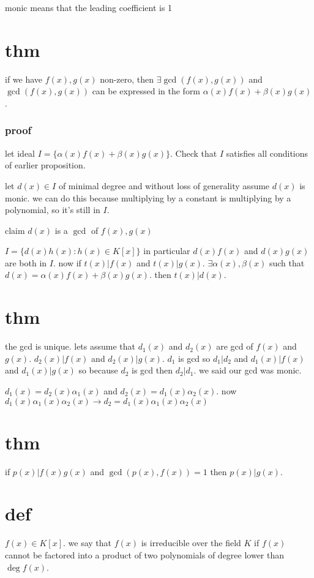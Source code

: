 \documentclass[letterpaper]{article}
\begin{document}
monic means that the leading coefficient is 1


\section*{thm}
if we have $f(x),g(x)$ non-zero, then $\exists\gcd(f(x),g(x))$ and $\gcd(f(x),g(x))$ can be expressed in the form $\alpha(x)f(x)+\beta(x)g(x)$.
\subsubsection*{proof}

let ideal $I=\{\alpha(x)f(x)+\beta(x)g(x)\}$. Check that $I$ satisfies all conditions of earlier proposition.

let $d(x)\in I$ of minimal degree and without loss of generality assume $d(x)$ is monic. we can do this because multiplying by a constant is multiplying by a polynomial, so it's still in $I$.

claim $d(x)$ is a $\gcd$ of $f(x),g(x)$

$I=\{d(x)h(x):h(x)\in K[x]\}$ in particular $d(x)f(x)$ and $d(x)g(x)$ are both in $I$. now if $t(x)|f(x)$ and $t(x)|g(x)$. $\exists\alpha(x),\beta(x)$ such that $d(x)=\alpha(x)f(x)+\beta(x)g(x)$. then $t(x)|d(x)$. 

\section*{thm}
the gcd is unique. lets assume that $d_1(x)$ and $d_2(x)$ are gcd of $f(x)$ and $g(x)$. $d_2(x)|f(x)$ and $d_2(x)|g(x)$. $d_1$ is gcd so $d_1|d_2$ and $d_1(x)|f(x)$ and $d_1(x)|g(x)$ so because $d_2$ is gcd then $d_2|d_1$. we said our gcd was monic.

$d_1(x)=d_2(x)\alpha_1(x)$ and $d_2(x)=d_1(x)\alpha_2(x)$. now $d_1(x)\alpha_1(x)\alpha_2(x)\to d_2=d_1(x)\alpha_1(x)\alpha_2(x)$

\section*{thm}
if $p(x)|f(x)g(x)$ and $\gcd(p(x),f(x))=1$ then $p(x)|g(x)$.

\section*{def}
$f(x)\in K[x]$. we say that $f(x)$ is irreducible over the field $K$ if $f(x)$ cannot be factored into a product of two polynomials of degree lower than $\deg f(x)$.
\end{document}
